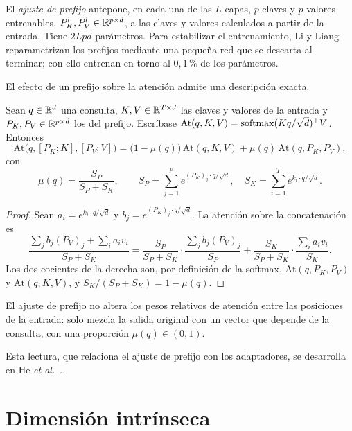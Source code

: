 \begin{definicion}\label{def:prefix}
El \emph{ajuste de prefijo} antepone, en cada una de las $L$ capas, $p$ claves y $p$ valores entrenables, $P_K^{l},P_V^{l}\in\mathbb{R}^{p\times d}$, a las claves y valores calculados a partir de la entrada. Tiene $2Lpd$ parámetros. Para estabilizar el entrenamiento, Li y Liang~\cite{li-liang} reparametrizan los prefijos mediante una pequeña red que se descarta al terminar; con ello entrenan en torno al $0{,}1\,\%$ de los parámetros.
\end{definicion}

El efecto de un prefijo sobre la atención admite una descripción exacta.

\begin{teorema}\label{teo:prefijo}
Sean $q\in\mathbb{R}^{d}$ una consulta, $K,V\in\mathbb{R}^{T\times d}$ las claves y valores de la entrada y $P_K,P_V\in\mathbb{R}^{p\times d}$ los del prefijo. Escríbase $\mathrm{At}(q,K,V)=\operatorname{softmax}(Kq/\sqrt{d})^{\top} V$. Entonces
\[
\mathrm{At}\bigl(q,[P_K;K],[P_V;V]\bigr)=\bigl(1-\mu(q)\bigr)\,\mathrm{At}(q,K,V)+\mu(q)\,\mathrm{At}(q,P_K,P_V),
\]
con
\[
\mu(q)=\frac{S_P}{S_P+S_K},\qquad S_P=\sum_{j=1}^{p}e^{(P_K)_j\cdot q/\sqrt{d}},\quad S_K=\sum_{i=1}^{T}e^{k_i\cdot q/\sqrt{d}}.
\]
\end{teorema}

\begin{proof}
Sean $a_i=e^{k_i\cdot q/\sqrt d}$ y $b_j=e^{(P_K)_j\cdot q/\sqrt d}$. La atención sobre la concatenación es
\[
\frac{\sum_j b_j(P_V)_j+\sum_i a_iv_i}{S_P+S_K}
=\frac{S_P}{S_P+S_K}\cdot\frac{\sum_j b_j(P_V)_j}{S_P}+\frac{S_K}{S_P+S_K}\cdot\frac{\sum_i a_iv_i}{S_K}.
\]
Los dos cocientes de la derecha son, por definición de la softmax, $\mathrm{At}(q,P_K,P_V)$ y $\mathrm{At}(q,K,V)$, y $S_K/(S_P+S_K)=1-\mu(q)$.
\end{proof}

\begin{corolario}\label{cor:prefijo}
El ajuste de prefijo no altera los pesos relativos de atención entre las posiciones de la entrada: solo mezcla la salida original con un vector que depende de la consulta, con una proporción $\mu(q)\in(0,1)$.
\end{corolario}

Esta lectura, que relaciona el ajuste de prefijo con los adaptadores, se desarrolla en He \emph{et al.}~\cite{he-unified}.

\section{Dimensión intrínseca}\label{sec:intrinseca}

